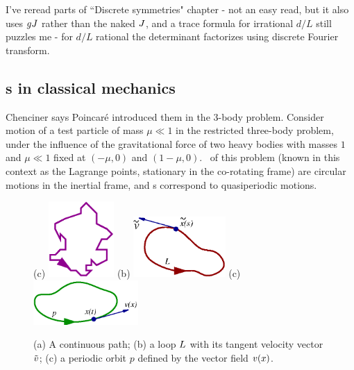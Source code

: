 I've reread parts of ``Discrete symmetries" chapter - not an easy read, but
it also uses $g{J}$ rather than the naked ${J}$, and a trace formula for irrational
$d/L$ still puzzles me - for $d/L$ rational the determinant factorizes using
discrete Fourier transform.

\subsection{{\Rpo s} in classical mechanics}

Chenciner
says Poincar\'e introduced them in the 3-body problem.
Consider motion of a test particle of mass
$\mu \ll 1$ in the
restricted three-body problem,
under the
influence of the gravitational force of two heavy bodies with masses $1$ and
$\mu \ll 1$ fixed at $(-\mu,0)$ and $(1-\mu,0)$. \Reqv\ of this problem
(known in this context as the Lagrange points, stationary in
the co-rotating frame) are circular motions in the inertial frame,
and {\rpo s} correspond to quasiperiodic motions. 

\begin{figure}[t] %
\centering
(c) \includegraphics[width=2.5cm]{figs/path.eps}
\hspace{0.1in}
(b) \includegraphics[width=3.5cm]{figs/loop.eps}
\hspace{0.1in}
(c) \includegraphics[width=4.0cm]{figs/porbit.eps}
\caption{
 (a) A continuous path; (b) a loop $L$ with its tangent velocity vector $\tilde{v}$;
 (c) a periodic orbit $p$ defined by the vector field $v(x)$.
        }
\label{f:loops}
\end{figure}

